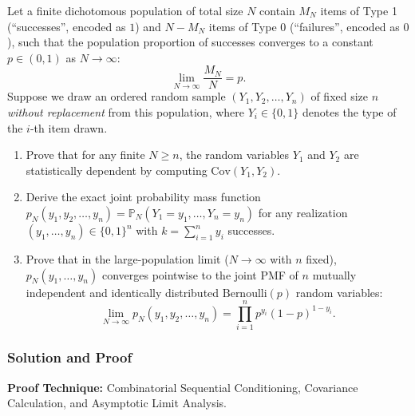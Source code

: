 \documentclass[11pt, letterpaper]{article}
\theoremstyle{definition}
\theoremstyle{remark}
\newcommand{\Prob}{\mathbb{P}}
\begin{document}
Let a finite dichotomous population of total size $N$ contain $M_N$ items of Type 1 (``successes'', encoded as $1$) and $N - M_N$ items of Type 0 (``failures'', encoded as $0$), such that the population proportion of successes converges to a constant $p \in (0, 1)$ as $N \to \infty$:
\[
    \lim_{N \to \infty} \frac{M_N}{N} = p.
\]
Suppose we draw an ordered random sample $(Y_1, Y_2, \dots, Y_n)$ of fixed size $n$ \emph{without replacement} from this population, where $Y_i \in \{0, 1\}$ denotes the type of the $i$-th item drawn.
\begin{enumerate}[label=(\alph*)]
    \item Prove that for any finite $N \ge n$, the random variables $Y_1$ and $Y_2$ are statistically dependent by computing $\text{Cov}(Y_1, Y_2)$.
    \item Derive the exact joint probability mass function $p_N(y_1, y_2, \dots, y_n) = \Prob_N(Y_1 = y_1, \dots, Y_n = y_n)$ for any realization $(y_1, \dots, y_n) \in \{0, 1\}^n$ with $k = \sum_{i=1}^n y_i$ successes.
    \item Prove that in the large-population limit ($N \to \infty$ with $n$ fixed), $p_N(y_1, \dots, y_n)$ converges pointwise to the joint PMF of $n$ mutually independent and identically distributed $\text{Bernoulli}(p)$ random variables:
    \[
        \lim_{N \to \infty} p_N(y_1, y_2, \dots, y_n) = \prod_{i=1}^{n} p^{y_i}(1 - p)^{1 - y_i}.
    \]
\end{enumerate}

\subsubsection*{Solution and Proof}

\textbf{Proof Technique:} Combinatorial Sequential Conditioning, Covariance Calculation, and Asymptotic Limit Analysis.
\end{document}
